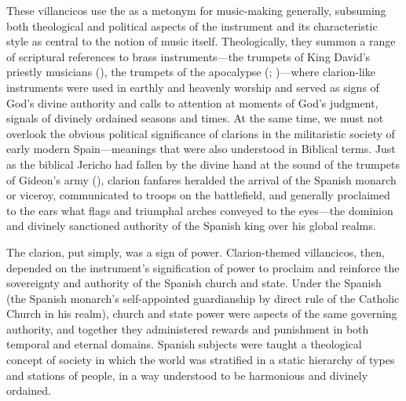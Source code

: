 %

These villancicos use the  as a metonym for music-making
generally, subsuming both theological and political aspects of the instrument
and its characteristic style as central to the notion of music itself.
Theologically, they summon a range of scriptural references to brass
instruments---the trumpets of King David's priestly musicians
(), the trumpets of the apocalypse
(; )---where clarion-like
instruments were used in earthly and heavenly worship and served as signs of
God's divine authority and calls to attention at moments of God's judgment,
signals of divinely ordained seasons and times.%
At the same time, we must not overlook the obvious political significance of
clarions in the militaristic society of early modern Spain---meanings that were
also understood in Biblical terms.
Just as the biblical Jericho had fallen by the divine hand at the sound of the
trumpets of Gideon's army (), clarion fanfares heralded
the arrival of the Spanish monarch or viceroy, communicated to troops on the
battlefield, and generally proclaimed to the ears what flags and triumphal arches
conveyed to the eyes---the dominion and divinely sanctioned authority of the
Spanish king over his global realms.

The clarion, put simply, was a sign of power.
Clarion-themed villancicos, then, depended on the instrument's signification of
power to proclaim and reinforce the sovereignty and authority of the Spanish
church and state.
Under the Spanish  (the Spanish monarch's self-appointed
guardianship by direct rule of the Catholic Church in his realm), church and
state power were aspects of the same governing authority, and together they
administered rewards and punishment in both temporal and eternal domains.
Spanish subjects were taught a theological concept of society in which the
world was stratified in a static hierarchy of types and stations of people, in
a way understood to be harmonious and divinely ordained.

